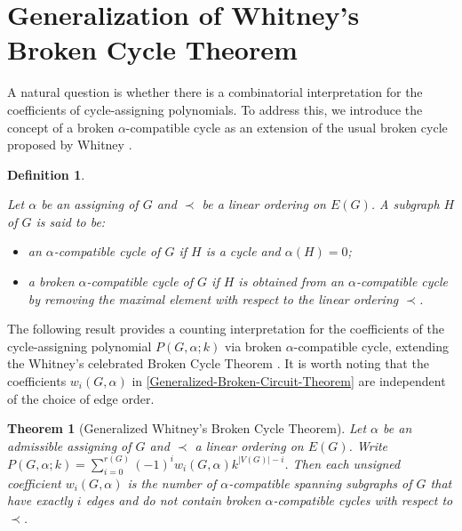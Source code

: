 \documentclass[12pt]{article}%
\numberwithin{equation}{section}
\newtheorem{theorem}{Theorem}[section]
\newtheorem{definition}[definition]{Definition}
\begin{document}
\section{Generalization of Whitney's Broken Cycle Theorem}\label{Sec3}
A natural question is whether there is a combinatorial interpretation for the coefficients of cycle-assigning polynomials. To address this, we introduce the concept of a broken $\alpha$-compatible cycle as an extension of the usual broken cycle proposed by Whitney \cite{Whitney1932}. 
\begin{definition}\label{Broken-Circuit}
{\rm Let $\alpha$ be an assigning of $G$ and $\prec$ be a linear ordering on $E(G)$. A subgraph $H$ of $G$ is said to be:
\begin{itemize}
\item an {\em $\alpha$-compatible cycle} of $G$ if $H$ is a cycle and $\alpha(H)=0$;
\item a {\em  broken $\alpha$-compatible cycle} of $G$ if $H$ is obtained from an $\alpha$-compatible cycle by removing the maximal element with respect to the linear ordering $\prec$.
\end{itemize}
}
\end{definition}
The following result provides a counting interpretation for the coefficients of the cycle-assigning polynomial $P(G,\alpha;k)$ via broken $\alpha$-compatible cycle, extending the Whitney's celebrated Broken Cycle Theorem  \cite{Whitney1932}. It is worth noting that the coefficients $w_i(G,\alpha)$ in \autoref{Generalized-Broken-Circuit-Theorem} are independent of the choice of edge order. 
\begin{theorem}[Generalized Whitney's Broken Cycle Theorem]\label{Generalized-Broken-Circuit-Theorem}
Let $\alpha$ be an admissible assigning of $G$ and $\prec$ a linear ordering on $E(G)$. Write $P(G,\alpha;k)=\sum_{i=0}^{r(G)}(-1)^{i}w_i(G,\alpha)k^{|V(G)|-i}$. Then each unsigned coefficient $w_i(G,\alpha)$ is the number of $\alpha$-compatible spanning subgraphs of $G$ that have exactly $i$ edges and do not contain  broken $\alpha$-compatible cycles with respect to $\prec$.
\end{theorem}
\end{document}
